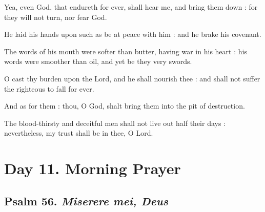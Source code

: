 Yea, even God, that endureth for ever, shall hear me, and bring them down : for they will not turn, nor fear God.\par
{}He laid his hands upon such as be at peace with him : and he brake his covenant.\par
{}The words of his mouth were softer than butter, having war in his heart : his words were smoother than oil, and yet be they very swords.\par
{}O cast thy burden upon the Lord, and he shall nourish thee : and shall not suffer the righteous to fall for ever.\par
{}And as for them : thou, O God, shalt bring them into the pit of destruction.\par
{}The blood-thirsty and deceitful men shall not live out half their days : nevertheless, my trust shall be in thee, O Lord.\par

\section*{Day 11. Morning Prayer}

\subsection{Psalm 56. \textit{Miserere mei, Deus}}

